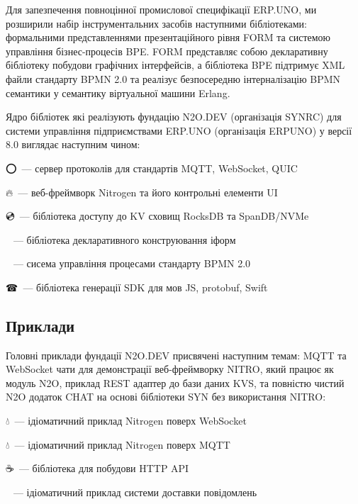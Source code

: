 Для запезпечення повноцінної промислової специфікації ERP.UNO, ми розширили
набір інструментальних засобів наступними бібліотеками: формальними представленнями
презентаційного рівня FORM та системою управління бізнес-процесів BPE. FORM представляє
собою декларативну бібліотеку побудови графічних інтерфейсів, а бібліотека BPE
підтримує XML файли стандарту BPMN 2.0 та реалізує безпосередню інтерналізацію
BPMN семантики у семантику віртуальної машини Erlang.

Ядро бібліотек які реалізують фундацію N2O.DEV (організація SYNRC) для системи
управління підприємствами ERP.UNO (організація ERPUNO) у версії 8.0 виглядає
наступним чином:

\setmainfont{Segoe UI Emoji}⭕\setmainfont{Geometria}\ --- сервер протоколів для стандартів MQTT, WebSocket, QUIC

\setmainfont{Segoe UI Emoji}🔥\setmainfont{Geometria}\ --- веб-фреймворк Nitrogen та його контрольні елементи UI

\setmainfont{Segoe UI Emoji}💿\setmainfont{Geometria}\ --- бібліотека доступу до KV сховищ RocksDB та SpanDB/NVMe

\setmainfont{Segoe UI Emoji}🧾\setmainfont{Geometria}\ --- бібліотека декларативного конструювання іформ

\setmainfont{Segoe UI Emoji}💠\setmainfont{Geometria}\ --- сисема управління процесами стандарту BPMN 2.0

\setmainfont{Segoe UI Emoji}☎\setmainfont{Geometria}\ --- бібліотека генерації SDK для мов JS, protobuf, Swift

\subsection{Приклади}

Головні приклади фундації N2O.DEV присвячені наступним темам: MQTT та WebSocket
чати для демонстрації веб-фреймворку NITRO, який працює як модуль N2O, приклад
REST адаптер до бази даних KVS, та повністю чистий N2O додаток CHAT на основі
бібліотеки SYN без використання NITRO:

\setmainfont{Segoe UI Emoji}💧\setmainfont{Geometria}\ --- ідіоматичний приклад Nitrogen поверх WebSocket

\setmainfont{Segoe UI Emoji}💧\setmainfont{Geometria}\ --- ідіоматичний приклад Nitrogen поверх MQTT

\setmainfont{Segoe UI Emoji}☕\setmainfont{Geometria}\ --- бібліотека для побудови HTTP API

\setmainfont{Segoe UI Emoji}💬\setmainfont{Geometria}\ --- ідіоматичний приклад системи доставки повідомлень

